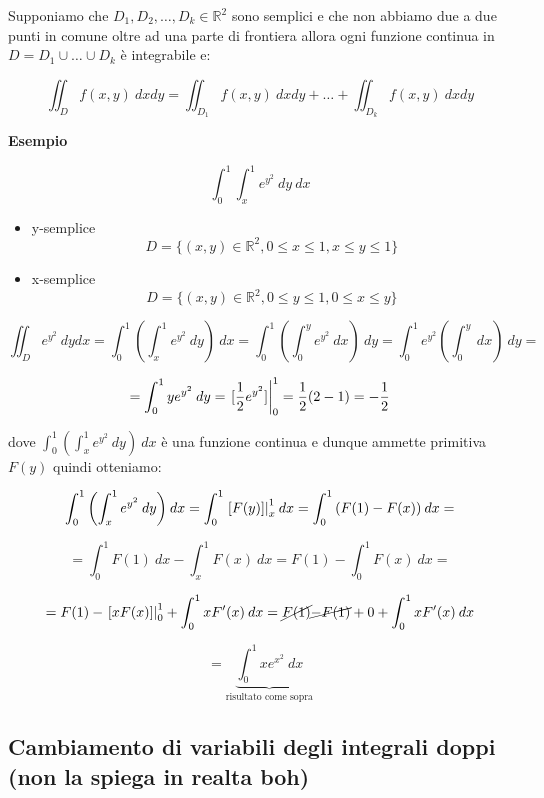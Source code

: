 \documentclass[../appunti-analisi.tex]{subfiles}
\begin{document}
Supponiamo che $D_1,D_2,\ldots,D_k \in \mathbb{R}^{2}$ sono semplici e che non abbiamo due a due punti in comune oltre ad una parte di frontiera allora ogni funzione continua in $D = D_1 \cup \ldots \cup D_k$ è integrabile e:

\[
    \iint_D {f(x,y)} \: d x d y = \iint_{D_1} {f(x,y)} \: d x d y + \ldots + \iint_{D_k} {f(x,y)} \: d x d y  
\]

\newpage

\textbf{Esempio}

\[
    \int_{0}^{1} {\int_{x}^{1} {e ^{y^{2}}} \: dy } \: dx 
\]

\begin{itemize}
    \item y-semplice
        \[
            D = \{(x,y) \in \mathbb{R}^{2}, 0 \le x \le 1, x \le y \le 1\}
        \]
    \item x-semplice
        \[
            D = \{(x,y) \in \mathbb{R}^{2}, 0 \le y \le 1, 0 \le x \le y\}
        \]
\end{itemize}

\[
    \iint_D {e ^{y^{2}}} \: d y d x = \int_{0}^{1} {\left(\int_{x}^{1} {e ^{y^{2}}} \: d y \right)} \: dx = \int_{0}^{1} {\left(\int_{0}^{y} {e ^{y^{2}}} \: dx \right)} \: d  y = \int_{0}^{1} {e ^{y^{2}}\left(\int_{0}^{y} {} \: dx \right)} \: dy  =
\]

\[
    = \int_{0}^{1} {y e ^{y^{2}}} \: dy  = \left.[\frac{1}{2} e ^{y^{2}}]\right\rvert_{0}^{1} = \frac{1}{2} (2 -1) = -\frac{1}{2}
\]

dove $\int_{0}^{1} {\left(\int_{x}^{1} {e ^{y^{2}}} \: dy \right)} \: dx $ è una funzione continua e dunque ammette primitiva $F(y)$ quindi otteniamo:

\[
    \int_{0}^{1} {\left(\int_{x}^{1} {e ^{y^{2}}} \: dy \right)} \: dx  = \int_{0}^{1} {\left.[F(y)]\right\rvert_{x}^{1} } \: dx = \int_{0}^{1} {\left(F(1) - F(x) \right)} \: dx =
\]

\[
    = \int_{0}^{1} {F(1)} \: d x - \int_{x}^{1} {F(x)} \: dx = F(1) - \int_{0}^{1} {F(x)} \: dx  =
\]

\[
    = F(1) - \left.[xF(x)]\right\rvert_{0}^{1} + \int_{0}^{1} {x F'(x)} \: dx = \cancel{F(1)} \cancel{- F(1)} + 0 + \int_{0}^{1} {xF'(x)} \: dx
\]

\[
    = \underbrace{\int_{0}^{1} {x e^{x^{2}}} \: dx }_\text{risultato come sopra}
\]

\subsection{Cambiamento di variabili degli integrali doppi (non la spiega in realta boh)}
\end{document}
